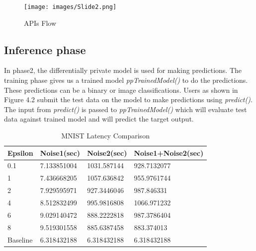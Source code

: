 \begin{figure}
    \centering
    \texttt{[image: images/Slide2.png]}
    \caption{APIs Flow}
    \label{default}
\end{figure}
\subsection{Inference phase}
In phase2, the differentially private model is used for making predictions. The training phase gives us a trained model \textit{ppTrainedModel()}
to do the predictions. These predictions can be a binary or image classifications. Users as shown in Figure 4.2 submit the test data on the model to make predictions using \textit{predict()}. The input from \textit{predict()} is passed to \textit{ppTrainedModel()} which will evaluate test data against trained model and will predict the target output.

\begin{table}[h!]
  \begin{center}
    \caption{MNIST Latency Comparison}
    \label{tab:table}
    \begin{tabular}{l|l|l|l}
      \textbf{Epsilon} & \textbf{Noise1(sec)} & \textbf{Noise2(sec)} & \textbf{Noise1+Noise2(sec)}\\
      \hline
0.1 &		7.133851004 &		1031.587144 &		928.7132077\\
1 &		7.436668205 &		1057.636842 &		955.9761744\\
2 &		7.929595971 &		927.3446046 &		987.846331\\
4 &		8.512832499 &		995.9816808 &		1066.971232\\
6 &		9.029140472 &		888.2222818 &		987.3786404\\
8 &		9.519301558 &		885.6387458 &		883.374013\\
Baseline &		6.318432188 &		6.318432188 &		6.318432188\\
    \end{tabular}
   \end{center}
\end{table}




